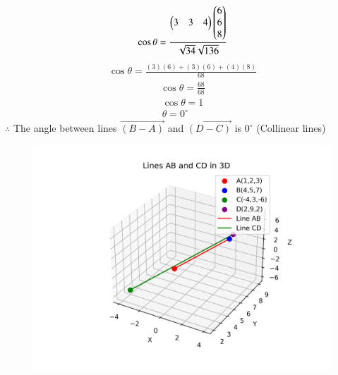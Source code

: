 \documentclass[journal,12pt,onecolumn]{IEEEtran}
\begin{document}
\begin{align}
    \cos{\theta}=\frac{\begin{pmatrix}3 & 3 & 4\end{pmatrix}\begin{pmatrix}6\\6\\8\end{pmatrix}}{\sqrt{34}\sqrt{136}}
\end{align}
\begin{align}
    \cos{\theta}=\frac{(3)(6)+(3)(6)+(4)(8)}{68}
\end{align}
\begin{align}
    \cos{\theta}=\frac{68}{68}
\end{align}
\begin{align}
    \cos{\theta}=1\\
    \theta=0^\circ
\end{align}
$\therefore$ The angle between lines $\vec{(B-A)}$ and $\vec{(D-C)}$ is $0^\circ$ (Collinear lines)
\begin{figure}[H]
	\centering
	\includegraphics[width=0.7\linewidth]{figs/fig1.png}
	\caption{}
	\label{fig}
\end{figure}
\end{document}
